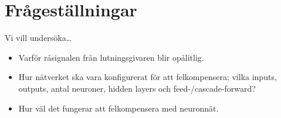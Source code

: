
\section{Frågeställningar}
Vi vill undersöka\ldots
\begin{itemize}
	\item Varför råsignalen från lutningsgivaren blir opålitlig.
	\item Hur nätverket ska vara konfigurerat för att felkompensera; vilka inputs,
		outputs, antal neuroner, hidden layers och feed-/cascade-forward? %
	\item Hur väl det fungerar att felkompensera med neuronnät.
\end{itemize}
